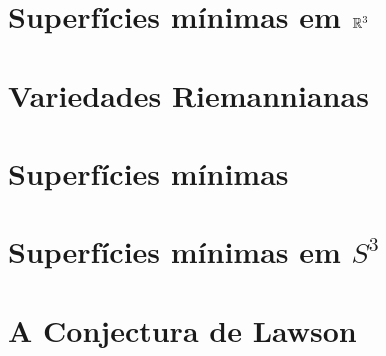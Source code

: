 \documentclass[mestrado, pre-defesa]{packages/icmc}
\begin{document}
\textual

\newcommand{\comando}[1]{\textbf{$\backslash$#1}}



%

\chapter{Superfícies mínimas em $\mathbb{R}^3$}
\label{chapter:superficies-minimas-em-R3}


\chapter{Variedades Riemannianas}
\label{chapter:variedades-riemannianas}


\chapter{Superfícies mínimas}
\label{chapter:superficies-minimas}


\chapter{Superfícies mínimas em $S^3$}
\label{chapter:superficies-minimas-em-S3}


\chapter{A Conjectura de Lawson}
\label{chapter:a-conjectura-de-lawson}

\end{document}
